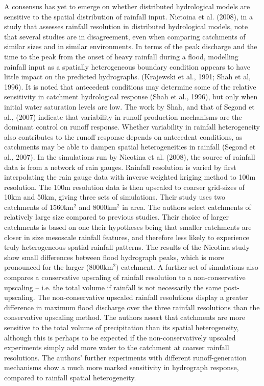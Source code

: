 \documentclass[12pt,oneside,PhD]{muthesis}
\begin{document}
A consensus has yet to emerge on whether distributed hydrological models are sensitive to the spatial distribution of rainfall input. Nictoina et al. (2008), in a study that assesses rainfall resolution in distributed hydrological models, note that several studies are in disagreement, even when comparing catchments of similar sizes and in similar environments. In terms of the peak discharge and the time to the peak from the onset of heavy rainfall during a flood, modelling rainfall input as a spatially heterogeneous boundary condition appears to have little impact on the predicted hydrographs.  (Krajewski et al., 1991; Shah et al, 1996). It is noted that antecedent conditions may determine some of the relative sensitivity in catchment hydrological response (Shah et al., 1996), but only when initial water saturation levels are low. The work by Shah, and that of Segond et al., (2007) indicate that variability in runoff production mechanisms are the dominant control on runoff response. Whether variability in rainfall heterogeneity also contributes to the runoff response depends on antecedent conditions, as catchments may be able to dampen spatial heterogeneities in rainfall (Segond et al., 2007). In the simulations run by Nicotina et al. (2008), the source of rainfall data is from a network of rain gauges. Rainfall resolution is varied by first interpolating the rain gauge data with inverse weighted kriging method to 100m resolution. The 100m resolution data is then upscaled to coarser grid-sizes of 10km and 50km, giving three sets of simulations. Their study uses two catchments of 1560km\(^2\) and 8000km\(^2\) in area. The authors select catchments of relatively large size compared to previous studies. Their choice of larger catchments is based on one their hypotheses being that smaller catchments are closer in size mesoscale rainfall features, and therefore less likely to experience truly heterogeneous spatial rainfall patterns. The results of the Nicotina study show small differences between flood hydrograph peaks, which is more pronounced for the larger (8000km\(^2)\) catchment. A further set of simulations also compares a conservative upscaling of rainfall resolution to a non-conservative upscaling -- i.e. the total volume if rainfall is not necessarily the same post-upscaling. The non-conservative upscaled rainfall resolutions display a greater difference in maximum flood discharge over the three rainfall resolutions than the conservative upscaling method. The authors assert that catchments are more sensitive to the total volume of precipitation than its spatial heterogeneity, although this is perhaps to be expected if the non-conservatively upscaled experiments simply add more water to the catchment at coarser rainfall resolutions. The authors' further experiments with different runoff-generation mechanisms show a much more marked sensitivity in hydrograph response, compared to rainfall spatial heterogeneity. 
\end{document}
